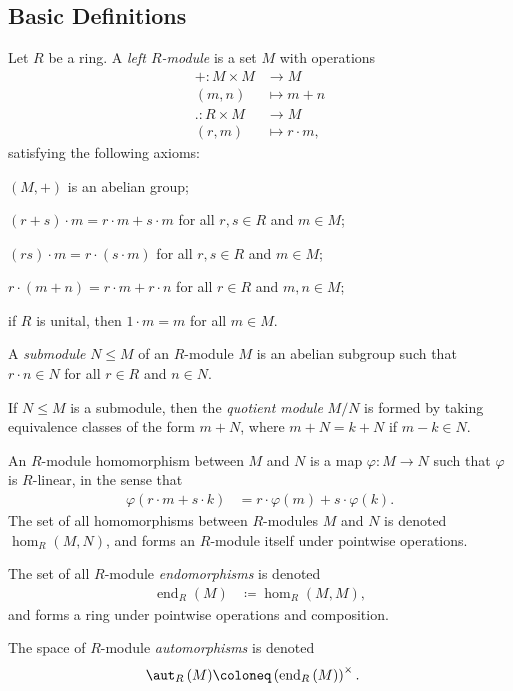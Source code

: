 \documentclass[10pt]{mypackage}
\begin{document}
\subsection{Basic Definitions}%
\begin{definition}
  Let $R$ be a ring. A \textit{left $R$-module} is a set $M$ with operations
  \begin{align*}
    +\colon M\times M&\rightarrow M\\
    \left( m,n \right) &\mapsto m+n\\
    .\colon R\times M&\rightarrow M\\
    \left( r,m \right) &\mapsto r\cdot m,
  \end{align*}
  satisfying the following axioms:
  \begin{description}[font=\normalfont]
    \item[(M0)] $\left( M,+ \right)$ is an abelian group;
    \item[(M1)] $\left( r+s \right)\cdot m = r\cdot m + s\cdot m$ for all $r,s\in R$ and $m\in M$;
    \item[(M2)] $\left( rs \right)\cdot m = r\cdot \left( s\cdot m \right)$ for all $r,s\in R$ and $m\in M$;
    \item[(M3)] $r\cdot \left( m+n \right) = r\cdot m + r\cdot n$ for all $r\in R$ and $m,n\in M$;
    \item[(M4)] if $R$ is unital, then $1\cdot m = m$ for all $m\in M$.
  \end{description}
  A \textit{submodule} $N\leq M$ of an $R$-module $M$ is an abelian subgroup such that $r\cdot n\in N$ for all $r\in R$ and $n\in N$.
\end{definition}
\begin{definition}
  If $N\leq M$ is a submodule, then the \textit{quotient module} $M/N$ is formed by taking equivalence classes of the form $m + N$, where $m+N = k + N$ if $m-k\in N$.
\end{definition}
\begin{definition}
  An $R$-module homomorphism between $M$ and $N$ is a map $\varphi\colon M\rightarrow N$ such that $\varphi$ is $R$-linear, in the sense that
  \begin{align*}
    \varphi\left( r\cdot m + s\cdot k \right) &= r\cdot\varphi(m) + s\cdot \varphi(k).
  \end{align*}
  The set of all homomorphisms between $R$-modules $M$ and $N$ is denoted $\hom_R(M,N)$, and forms an $R$-module itself under pointwise operations.%

  The set of all $R$-module \textit{endomorphisms} is denoted
  \begin{align*}
    \operatorname{end}_R(M) &\coloneq \hom_R\left( M,M \right),
  \end{align*}
  and forms a ring under pointwise operations and composition.%

  The space of $R$-module \textit{automorphisms} is denoted
  \begin{align*}
    \aut_R\left( M \right) &\coloneq \left( \operatorname{end}_R\left( M \right) \right)^{\times}.
  \end{align*}
\end{definition}
\end{document}
